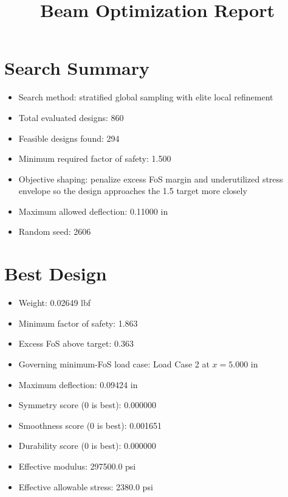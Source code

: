\documentclass[11pt]{article}
\title{Beam Optimization Report}
\date{}
\begin{document}
\maketitle

\section*{Search Summary}
\begin{itemize}
\item Search method: stratified global sampling with elite local refinement
\item Total evaluated designs: 860
\item Feasible designs found: 294
\item Minimum required factor of safety: 1.500
\item Objective shaping: penalize excess FoS margin and underutilized stress envelope so the design approaches the 1.5 target more closely
\item Maximum allowed deflection: 0.11000 in
\item Random seed: 2606
\end{itemize}

\section*{Best Design}
\begin{itemize}
\item Weight: 0.02649 lbf
\item Minimum factor of safety: 1.863
\item Excess FoS above target: 0.363
\item Governing minimum-FoS load case: Load Case 2 at $x=5.000$ in
\item Maximum deflection: 0.09424 in
\item Symmetry score (0 is best): 0.000000
\item Smoothness score (0 is best): 0.001651
\item Durability score (0 is best): 0.000000
\item Effective modulus: 297500.0 psi
\item Effective allowable stress: 2380.0 psi
\end{itemize}
\end{document}
